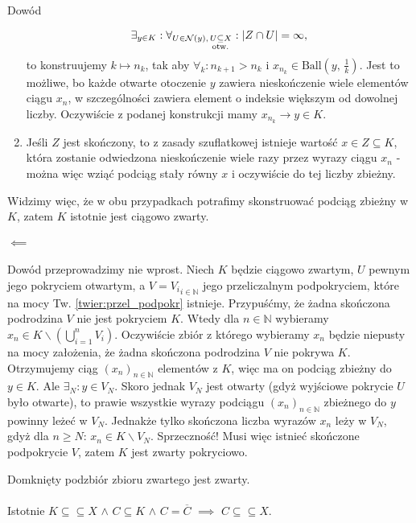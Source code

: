 \documentclass{article}
\numberwithin{defi}{section}
\numberwithin{defi}{section}
\newcommand{\N}{\mathbb{N}}
\newcommand{\oo}{\infty}
\newcommand{\Nau}{\mathcal{N}}
\newcommand{\subotw}{\underset{\clap{\scriptsize otw.}}{\subseteq}}
\providecommand{\ol}{\overline}
\newcommand{\ciag}[1]{(#1_{n})_{n \in \N}}
\newcommand{\ball}[2]{\text{Ball}(#1, \, #2)}
\begin{document}
\begin{dow}{Dowód}
\begin{enumerate}
\begin{equation*}
                \exists_{y \in K}: \forall_{U \in \Nau(y), \, U \subotw X}: | Z \cap U | = \oo,
            \end{equation*} to konstruujemy $k \mapsto n_k$, tak aby $\forall_k: n_{k+1} > n_k$ i $x_{n_k} \in \ball{y}{\frac{1}{k}}$. Jest to możliwe, bo każde otwarte otoczenie $y$ zawiera nieskończenie wiele elementów ciągu $x_n$, w szczególności zawiera element o indeksie większym od dowolnej liczby. Oczywiście z podanej konstrukcji mamy $x_{n_k} \to y \in K$.
            \item Jeśli $Z$ jest skończony, to z zasady szuflatkowej istnieje wartość $x \in Z \subseteq K$, która zostanie odwiedzona nieskończenie wiele razy przez wyrazy ciągu $x_n$ - można więc wziąć podciąg stały równy $x$ i oczywiście do tej liczby zbieżny.
        \end{enumerate} Widzimy więc, że w obu przypadkach potrafimy skonstruować podciąg zbieżny w $K$, zatem $K$ istotnie jest ciągowo zwarty.
        
        \paragraph{$\impliedby$} Dowód przeprowadzimy nie wprost. Niech $K$ będzie ciągowo zwartym, $U$ pewnym jego pokryciem otwartym, a $V = {V_i}_{i \in \N}$ jego przeliczalnym podpokryciem, które na mocy Tw. \ref{twier:przel_podpokr} istnieje. Przypuśćmy, że żadna skończona podrodzina $V$ nie jest pokryciem $K$. Wtedy dla $n \in \N$ wybieramy $x_n \in K \backslash (\bigcup_{i=1}^{n}V_i)$. Oczywiście zbiór z którego wybieramy $x_n$ będzie niepusty na mocy założenia, że żadna skończona podrodzina $V$ nie pokrywa $K$. Otrzymujemy ciąg $\ciag{x}$ elementów z $K$, więc ma on podciąg zbieżny do $y \in K$. Ale $\exists_{N}: y \in V_N$. Skoro jednak $V_N$ jest otwarty (gdyż wyjściowe pokrycie $U$ było otwarte), to prawie wszystkie wyrazy podciągu $\ciag{x}$ zbieżnego do $y$ powinny leżeć w $V_N$. Jednakże tylko skończona liczba wyrazów $x_n$ leży w $V_N$, gdyż dla $n \geqslant N$: $x_n \in K \backslash V_N$. Sprzeczność! Musi więc istnieć skończone podpokrycie $V$, zatem $K$ jest zwarty pokryciowo.  


    \end{dow}

    \begin{obs}{} \label{obs:domk-podzb-zwar}
        Domknięty podzbiór zbioru zwartego jest zwarty.
    \end{obs}
    \paragraph*{} Istotnie $K \subseteq \subseteq X$ $\wedge$ $C \subseteq K$ $\wedge$ $C = \ol{C}$ $\implies$ $C \subseteq \subseteq X$.
\end{document}
